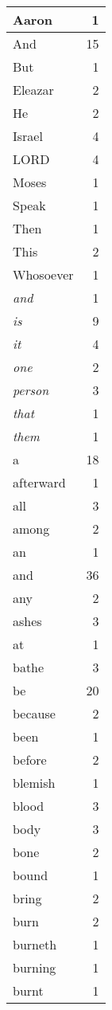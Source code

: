 \begin{center}
\begin{longtable}{l|r}
\hline \hline
\endlastfoot
Aaron & 1 \\ \hline
And & 15 \\ \hline
But & 1 \\ \hline
Eleazar & 2 \\ \hline
He & 2 \\ \hline
Israel & 4 \\ \hline
LORD & 4 \\ \hline
Moses & 1 \\ \hline
Speak & 1 \\ \hline
Then & 1 \\ \hline
This & 2 \\ \hline
Whosoever & 1 \\ \hline
\emph{and} & 1 \\ \hline
\emph{is} & 9 \\ \hline
\emph{it} & 4 \\ \hline
\emph{one} & 2 \\ \hline
\emph{person} & 3 \\ \hline
\emph{that} & 1 \\ \hline
\emph{them} & 1 \\ \hline
a & 18 \\ \hline
afterward & 1 \\ \hline
all & 3 \\ \hline
among & 2 \\ \hline
an & 1 \\ \hline
and & 36 \\ \hline
any & 2 \\ \hline
ashes & 3 \\ \hline
at & 1 \\ \hline
bathe & 3 \\ \hline
be & 20 \\ \hline
because & 2 \\ \hline
been & 1 \\ \hline
before & 2 \\ \hline
blemish & 1 \\ \hline
blood & 3 \\ \hline
body & 3 \\ \hline
bone & 2 \\ \hline
bound & 1 \\ \hline
bring & 2 \\ \hline
burn & 2 \\ \hline
burneth & 1 \\ \hline
burning & 1 \\ \hline
burnt & 1 \\ \hline

\end{longtable}
\end{center}
